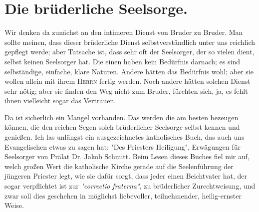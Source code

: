 \documentclass[a5paper,openany]{book}
\begin{document}
\section{Die brüderliche Seelsorge.}
Wir denken da zunächst an den intimeren Dienst von Bruder zu Bruder. Man sollte meinen, dass dieser brüderliche Dienst selbstverständlich unter uns reichlich gepflegt werde; aber Tatsache ist, dass sehr oft der Seelsorger, der so vielen dient, selbst keinen Seelsorger hat. Die einen haben kein Bedürfnis darnach; es sind selbständige, einfache, klare Naturen. Andere hätten das Bedürfnis wohl; aber sie wollen allein mit ihrem \textsc{Herrn} fertig werden. Noch andere hätten solchen Dienst sehr nötig; aber sie finden den Weg nicht zum Bruder, fürchten sich, ja, es fehlt ihnen vielleicht sogar das Vertrauen.
\par
Da ist sicherlich ein Mangel vorhanden. Das werden die am besten bezeugen können, die den reichen Segen solch brüderlicher Seelsorge selbst kennen und genießen. Ich las unlängst ein ausgezeichnetes katholisches Buch, das auch uns Evangelischen etwas zu sagen hat: "Des Priesters Heiligung", Erwägungen für Seelsorger von Prälat Dr. Jakob Schmitt. Beim Lesen dieses Buches fiel mir auf, welch großen Wert die katholische Kirche gerade auf die Seelenführung der jüngeren Priester legt, wie sie dafür sorgt, dass jeder einen Beichtvater hat, der sogar verpflichtet ist zur \emph{"correctio fraterna"}, zu brüderlicher Zurechtweisung, und zwar soll dies geschehen in möglichst liebevoller, teilnehmender, heilig-ernster Weise.
\par
\end{document}
